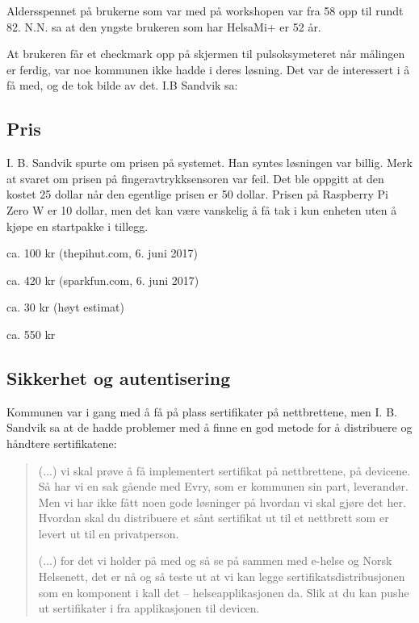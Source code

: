 Aldersspennet på brukerne som var med på workshopen var fra 58 opp til rundt 82. N.N. sa at den yngste brukeren som har HelsaMi+ er 52 år.

At brukeren får et checkmark opp på skjermen til pulsoksymeteret når målingen er ferdig, var noe kommunen ikke hadde i deres løsning. Det var
de interessert i å få med, og de tok bilde av det. I.B Sandvik sa: 

\subsection{Pris}
I. B. Sandvik spurte om prisen på systemet. Han syntes løsningen var billig. Merk at svaret om prisen på fingeravtrykksensoren var feil.
Det ble oppgitt at den kostet 25 dollar når den egentlige prisen er 50 dollar. Prisen på Raspberry Pi Zero W er 10 dollar, men det kan
være vanskelig å få tak i kun enheten uten å kjøpe en startpakke i tillegg.

\begin{description}[leftmargin=!,labelwidth=\widthof{\bfseries Knapp, lysdioder, annet}]
    \item[Raspberry Pi Zero W:] ca. 100 kr (thepihut.com, 6. juni 2017)
    \item[GT511-C3:] ca. 420 kr (sparkfun.com, 6. juni 2017)
    \item[Knapp, lysdioder, annet:] ca. 30 kr (høyt estimat)
    \item[Totalsum:] ca. 550 kr
\end{description}

\subsection{Sikkerhet og autentisering}
Kommunen var i gang med å få på plass sertifikater på nettbrettene, men I. B. Sandvik sa at de hadde problemer med å finne en god metode
for å distribuere og håndtere sertifikatene:
\blockquote{(...) vi skal prøve å få implementert sertifikat på nettbrettene, på devicene. Så har vi en sak gående med Evry, som er kommunen sin part, leverandør.
    Men vi har
    ikke fått noen gode løsninger på hvordan vi skal gjøre det her. Hvordan skal du distribuere et sånt sertifikat ut til et nettbrett som er levert ut til en
    privatperson.

(...) for det vi holder på med og så se på sammen med e-helse og Norsk Helsenett, det er nå og så teste ut at vi kan legge
sertifikatsdistribusjonen som en komponent i
kall det -- helseapplikasjonen da. Slik at du kan pushe ut sertifikater i fra applikasjonen til devicen.}


